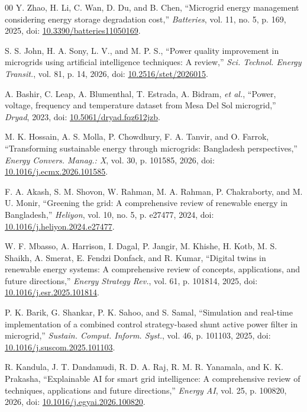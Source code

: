 \documentclass[conference,a4paper]{IEEEtran}
\begin{document}
\begin{thebibliography}{00}
 Y. Zhao, H. Li, C. Wan, D. Du,
and B. Chen, ``Microgrid energy management considering energy storage
degradation cost,'' \emph{Batteries}, vol. 11, no. 5, p. 169, 2025,
doi: \href{https://doi.org/10.3390/batteries11050169}{10.3390/batteries11050169}.

 S. S. John, H. A. Sony, L. V., and
M. P. S., ``Power quality improvement in microgrids using artificial
intelligence techniques: A review,'' \emph{Sci. Technol. Energy
Transit.}, vol. 81, p. 14, 2026, doi:
\href{https://doi.org/10.2516/stet/2026015}{10.2516/stet/2026015}.

 A. Bashir, C. Leap, A. Blumenthal, T.
Estrada, A. Bidram, \emph{et al.}, ``Power, voltage, frequency and
temperature dataset from Mesa Del Sol microgrid,'' \emph{Dryad}, 2023,
doi: \href{https://doi.org/10.5061/dryad.fqz612jzb}{10.5061/dryad.fqz612jzb}.

 M. K. Hossain, A. S. Molla, P.
Chowdhury, F. A. Tanvir, and O. Farrok, ``Transforming sustainable
energy through microgrids: Bangladesh perspectives,'' \emph{Energy
Convers. Manag.: X}, vol. 30, p. 101585, 2026, doi:
\href{https://doi.org/10.1016/j.ecmx.2026.101585}{10.1016/j.ecmx.2026.101585}.

 F. A. Akash, S. M. Shovon, W. Rahman,
M. A. Rahman, P. Chakraborty, and M. U. Monir, ``Greening the grid: A
comprehensive review of renewable energy in Bangladesh,'' \emph{Heliyon},
vol. 10, no. 5, p. e27477, 2024, doi:
\href{https://doi.org/10.1016/j.heliyon.2024.e27477}{10.1016/j.heliyon.2024.e27477}.

 W. F. Mbasso, A. Harrison, I. Dagal, P.
Jangir, M. Khishe, H. Kotb, M. S. Shaikh, A. Smerat, E. Fendzi Donfack,
and R. Kumar, ``Digital twins in renewable energy systems: A
comprehensive review of concepts, applications, and future
directions,'' \emph{Energy Strategy Rev.}, vol. 61, p. 101814, 2025,
doi: \href{https://doi.org/10.1016/j.esr.2025.101814}{10.1016/j.esr.2025.101814}.

 P. K. Barik, G. Shankar, P. K. Sahoo, and
S. Samal, ``Simulation and real-time implementation of a combined
control strategy-based shunt active power filter in microgrid,''
\emph{Sustain. Comput. Inform. Syst.}, vol. 46, p. 101103, 2025, doi:
\href{https://doi.org/10.1016/j.suscom.2025.101103}{10.1016/j.suscom.2025.101103}.

 R. Kandula, J. T. Dandamudi, R. D. A.
Raj, R. M. R. Yanamala, and K. K. Prakasha, ``Explainable AI for smart
grid intelligence: A comprehensive review of techniques, applications
and future directions,'' \emph{Energy AI}, vol. 25, p. 100820, 2026,
doi: \href{https://doi.org/10.1016/j.egyai.2026.100820}{10.1016/j.egyai.2026.100820}.


\end{thebibliography}
\end{document}
